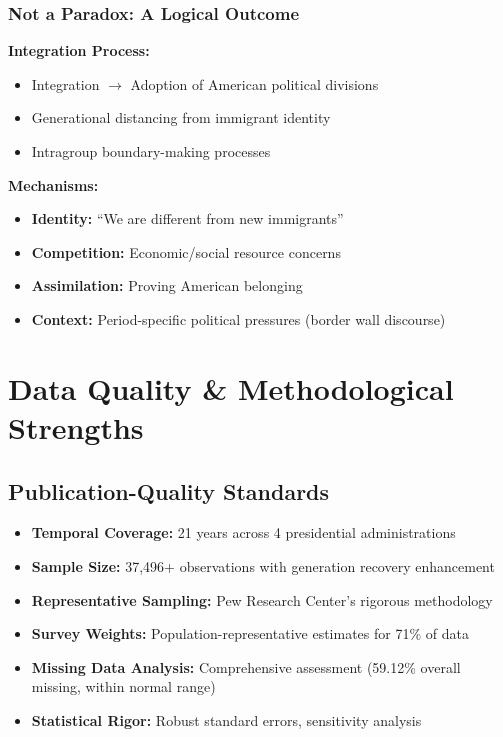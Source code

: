 \documentclass[11pt,letterpaper]{article}
\begin{document}
\subsubsection{Not a Paradox: A Logical Outcome}

\textbf{Integration Process:}
\begin{itemize}
    \item Integration $\rightarrow$ Adoption of American political divisions
    \item Generational distancing from immigrant identity
    \item Intragroup boundary-making processes
\end{itemize}

\textbf{Mechanisms:}
\begin{itemize}
    \item \textbf{Identity:} ``We are different from new immigrants''
    \item \textbf{Competition:} Economic/social resource concerns
    \item \textbf{Assimilation:} Proving American belonging
    \item \textbf{Context:} Period-specific political pressures (border wall discourse)
\end{itemize}

\section{Data Quality \& Methodological Strengths}

\subsection{Publication-Quality Standards}
\begin{itemize}
    \item \textbf{Temporal Coverage:} 21 years across 4 presidential administrations
    \item \textbf{Sample Size:} 37,496+ observations with generation recovery enhancement
    \item \textbf{Representative Sampling:} Pew Research Center's rigorous methodology
    \item \textbf{Survey Weights:} Population-representative estimates for 71\% of data
    \item \textbf{Missing Data Analysis:} Comprehensive assessment (59.12\% overall missing, within normal range)
    \item \textbf{Statistical Rigor:} Robust standard errors, sensitivity analysis
\end{itemize}
\end{document}
